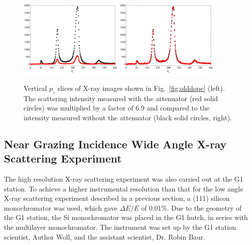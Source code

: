 \begin{figure}[htbp]
  \centering
  \includegraphics[width=0.45\textwidth]{figures/ripple/MMs/laxs/attenuator1}
  \includegraphics[width=0.45\textwidth]{figures/ripple/MMs/laxs/attenuator2}
  \caption{Vertical $p_z$ slices of X-ray images shown in Fig.~\ref{fig:olddopc}
  (left). The scattering intensity measured with the attenuator (red solid circles) 
  was multiplied by 
  a factor of 6.9 and compared to the intensity measured 
  without the attenuator (black solid circles, right).}
  \label{fig:attenuator}
\end{figure}

\subsection{Near Grazing Incidence Wide Angle X-ray Scattering Experiment}
\label{NGIWAXS_method}
The high resolution X-ray scattering experiment was also carried out at 
the G1 station. To achieve a higher instrumental resolution than that for 
the low angle X-ray scattering experiment described in a previous section, 
a (111) silicon monochromator was used, which gave $\Delta E/E$ of 0.01\%.
Due to the geometry of the G1 station, the Si monochromator was placed in
the G1 hutch, in series with the multilayer monochromator. 
The instrument was set up by the G1
station scientist, Author Woll, and the assistant scientist, Dr. Robin Baur.

